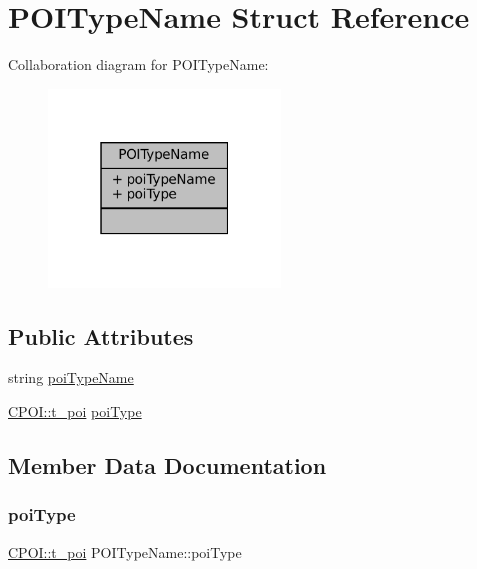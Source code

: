 \hypertarget{structPOITypeName}{}\section{P\+O\+I\+Type\+Name Struct Reference}
\label{structPOITypeName}


Collaboration diagram for P\+O\+I\+Type\+Name\+:
\nopagebreak
\begin{figure}[H]
\begin{center}
\leavevmode
\includegraphics[width=175pt]{structPOITypeName__coll__graph}
\end{center}
\end{figure}
\subsection*{Public Attributes}
\begin{DoxyCompactItemize}
\item 
string \hyperlink{structPOITypeName_a2db157ca193d5d994f216f29377d24d1}{poi\+Type\+Name}
\item 
\hyperlink{classCPOI_a4b95e2e14055d2f9ca134e474dd4a19f}{C\+P\+O\+I\+::t\+\_\+poi} \hyperlink{structPOITypeName_a01d9d6fe156e851207e9c765bd4defaf}{poi\+Type}
\end{DoxyCompactItemize}


\subsection{Member Data Documentation}
\mbox{\label{structPOITypeName_a01d9d6fe156e851207e9c765bd4defaf}} 
\subsubsection{\texorpdfstring{poi\+Type}{poiType}}
{\footnotesize\ttfamily \hyperlink{classCPOI_a4b95e2e14055d2f9ca134e474dd4a19f}{C\+P\+O\+I\+::t\+\_\+poi} P\+O\+I\+Type\+Name\+::poi\+Type}

